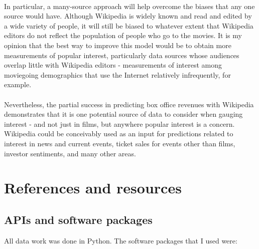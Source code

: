 \documentclass[10pt]{article}
\begin{document}
    \paragraph{}
     In particular, a many-source approach will help overcome the biases that any one source would have. Although Wikipedia is widely known and read and edited by a wide variety of people, it will still be biased to whatever extent that Wikipedia editors do not reflect the population of people who go to the movies. It is my opinion that the best way to improve this model would be to obtain more measurements of popular interest, particularly data sources whose audiences overlap little with Wikipedia editors - measurements of interest among moviegoing demographics that use the Internet relatively infrequently, for example. 
    
    \paragraph{}
    Nevertheless, the partial success in predicting box office revenues with Wikipedia demonstrates that it is one potential source of data to consider when gauging interest - and not just in films, but anywhere popular interest is a concern. Wikipedia could be conceivably used as an input for predictions related to interest in news and current events, ticket sales for events other than films, investor sentiments, and many other areas. 
    
    \section{References and resources}
    
    \subsection{APIs and software packages}
    
    All data work was done in Python. The software packages that I used were: 
    
\end{document}
